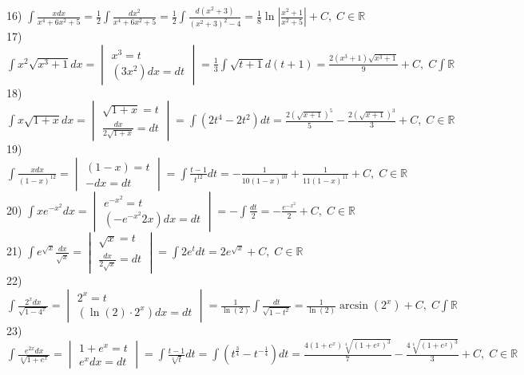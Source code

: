 \documentclass[14pt]{article}
\begin{document}
	16) $\int \frac{xdx}{x^4+6x^2 + 5} = \frac{1}{2} \int \frac{dx^2}{x^4 + 6x^2 + 5} = \frac{1}{2} \int \frac{d(x^2+3)}{(x^2+3)^2-4} = \frac{1}{8} \ln |\frac{x^2+1}{x^2+5}| + C, \; C \in \mathbb{R}$ \\
	17) $\int x^2\sqrt{x^3 + 1}dx=\begin{vmatrix} x^3 = t \\ (3x^2)dx = dt \end{vmatrix} = \frac{1}{3} \int \sqrt{t+1}d(t+1) = \frac{2(x^3+1)\sqrt{x^3+1}}{9}+C, \; C \int \mathbb{R}$ \\
	18) $\int x\sqrt{1+x}dx = \begin{vmatrix}\sqrt{1+x}=t \\ \frac{dx}{2\sqrt{1+x}}=dt  \end{vmatrix} = \int (2t^4 -2t^2)dt = \frac{2(\sqrt{x+1})^5}{5} - \frac{2(\sqrt{x+1})^3}{3} + C, \; C \in \mathbb{R}$ \\
	19) $\int \frac{xdx}{(1-x)^{12}} = \begin{vmatrix}(1-x) = t \\ -dx = dt \end{vmatrix} = \int \frac{t-1}{t^{12}}dt = -\frac{1}{10(1-x)^{10}} + \frac{1}{11(1-x)^{11}}+C, \; C \in \mathbb{R}$ \\
	20) $\int xe^{-x^2}dx = 
	\begin{vmatrix}
		e^{-x^2}=t \\
		(-e^{-x^2}2x) dx=dt
	\end{vmatrix} = -\int \frac{dt}{2} = - \frac{e^{-x^2}}{2} + C, \; C \in \mathbb{R}$ \\
	21) $\int e^{\sqrt{x}} \frac{dx}{\sqrt{x}} = 
	\begin{vmatrix}
		\sqrt{x}=t \\
		\frac{dx}{2\sqrt{x}}=dt	
	\end{vmatrix} = \int 2e^t dt = 2 e^{\sqrt{x}}+C, \; C \in \mathbb{R}$ \\
	22) $\int \frac{2^x dx}{\sqrt{1-4^x}} = \begin{vmatrix}
		2^x = t \\
		(\ln(2) \cdot 2^x)dx = dt
	\end{vmatrix}= \frac{1}{\ln(2)} \int \frac{dt}{\sqrt{1-t^2}}=\frac{1}{\ln(2)}\arcsin(2^x) + C, \; C \int \mathbb{R}$ \\
	23) $\int \frac{e^{2x}dx}{\sqrt[4]{1+e^x}}=\begin{vmatrix}
		1+e^x=t \\
		e^xdx = dt
	\end{vmatrix} = \int \frac{t-1}{\sqrt[4]{t}}dt = \int (t^{\frac{3}{4}}-t^{-\frac{1}{4}})dt=\frac{4(1+e^x)\sqrt[4]{(1+e^x)^3}}{7} - \frac{4\sqrt[4]{(1+e^x)^3}}{3} + C, \; C \in \mathbb{R}$ \\
\end{document}
